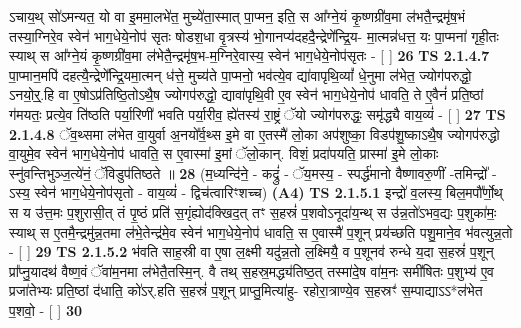 \documentclass[17pt]{extarticle}
\begin{document}
                  ऽचाय॒थ् सो॑ऽमन्यत॒ यो वा इ॒ममा॒लभे॑त॒ मुच्ये॑ता॒स्मात् पा॒प्मन॒ इति॒ स आ᳚ग्ने॒यं कृ॒ष्णग्री॑व॒मा ल॑भतै॒न्द्रमृ॑ष॒भं तस्या॒ग्निरे॒व स्वेन॑ भाग॒धेये॒नोप॑ सृतः षोडश॒धा वृ॒त्रस्य॑ भो॒गानप्य॑दहदै॒न्द्रेणे᳚न्द्रि॒य- मा॒त्मन्न॑धत्त॒ यः पा॒प्मना॑ गृही॒तः स्याथ् स आ᳚ग्ने॒यं कृ॒ष्णग्री॑व॒मा ल॑भेतै॒न्द्रमृ॑ष॒भ-म॒ग्निरे॒वास्य॒ स्वेन॑ भाग॒धेये॒नोप॑सृतः - [  ] \textbf{  26} \newline
                  \newline
                                \textbf{ TS 2.1.4.7} \newline
                  पा॒प्मान॒मपि॑ दहत्यै॒न्द्रेणे᳚न्द्रि॒यमा॒त्मन् ध॑त्ते॒ मुच्य॑ते पा॒प्मनो॒ भव॑त्ये॒व द्या॑वापृथि॒व्यां᳚ धे॒नुमा ल॑भेत॒ ज्योग॑परुद्धो॒ ऽनयो॒र्॒॒.हि वा  ए॒षोऽप्र॑तिष्ठि॒तोऽथै॒ष ज्योगप॑रुद्धो॒ द्यावा॑पृथि॒वी ए॒व स्वेन॑ भाग॒धेये॒नोप॑ धावति॒ ते ए॒वैनं॑ प्रति॒ष्ठां ग॑मयतः॒ प्रत्ये॒व ति॑ष्ठति पर्या॒रिणी॑ भवति पर्या॒रीव॒ ह्ये॑तस्य॑ रा॒ष्ट्रं ॅयो ज्योग॑परुद्धः॒ समृ॑द्ध्यै वाय॒व्यं॑ - [  ] \textbf{  27} \newline
                  \newline
                                \textbf{ TS 2.1.4.8} \newline
                  ॅव॒थ्समा ल॑भेत वा॒युर्वा अ॒नयो᳚र्व॒थ्स इ॒मे वा ए॒तस्मै॑ लो॒का अप॑शुष्का॒ विडप॑शु॒ष्काऽथै॒ष ज्योगप॑रुद्धो वा॒युमे॒व स्वेन॑ भाग॒धेये॒नोप॑ धावति॒ स ए॒वास्मा॑ इ॒मां ॅलो॒कान्. विशं॒ प्रदा॑पयति॒ प्रास्मा॑ इ॒मे लो॒काः स्नु॑वन्तिभुञ्ज॒त्ये॑नं॒ ॅविडुप॑तिष्ठते ॥ \textbf{  28} \newline
                  \newline
                      (म॒ध्यन्दि॑ने॒ - कद्रुं॑ - ॅय॒मस्य॒ - स्पर्द्ध॑मानो वैष्णावरु॒णीं -तमिन्द्रो᳚ - ऽस्य॒ स्वेन॑ भाग॒धेये॒नोप॑सृतो - वाय॒व्यं॑ - द्विच॑त्वारिꣳशच्च)  \textbf{(A4)} \newline \newline
                                        \textbf{ TS 2.1.5.1} \newline
                  इन्द्रो॑ व॒लस्य॒ बिल॒मपौ᳚र्णो॒थ् स य उ॑त्त॒मः प॒शुरासी॒त् तं पृ॒ष्ठं प्रति॑ स॒गृंह्योद॑क्खिद॒त् तꣳ स॒हस्रं॑ प॒शवोऽनूदा॑य॒न्थ् स उ॑न्न॒तो॑ऽभव॒द्यः प॒शुका॑मः॒ स्याथ् स ए॒तमै॒न्द्रमु॑न्न॒तमा ल॑भे॒तेन्द्र॑मे॒व स्वेन॑ भाग॒धेये॒नोप॑ धावति॒ स ए॒वास्मै॑ प॒शून् प्रय॑च्छति पशु॒माने॒व भ॑वत्युन्न॒तो -  [  ] \textbf{  29} \newline
                  \newline
                                \textbf{ TS 2.1.5.2} \newline
                  भ॑वति साह॒स्री वा ए॒षा ल॒क्ष्मी यदु॑न्न॒तो ल॒क्ष्मियै॒ व प॒शूनव॑ रुन्धे य॒दा स॒हस्रं॑ प॒शून् प्रा᳚प्नु॒यादथ॑ वैष्ण॒वं ॅवा॑म॒नमा ल॑भेतै॒तस्मि॒न्. वै तथ् स॒हस्र॒मद्ध्य॑तिष्ठ॒त् तस्मा॑दे॒ष वा॑म॒नः समी॑षितः प॒शुभ्य॑ ए॒व प्रजा॑तेभ्यः प्रति॒ष्ठां द॑धाति॒ को॑ऽर्.हति स॒हस्रं॑ प॒शून् प्राप्तु॒मित्या॑हु- रहोरा॒त्राण्ये॒व स॒हस्रꣳ॑ स॒म्पाद्याऽऽ*ल॑भेत प॒शवो॒ - [  ] \textbf{  30} \newline
\end{document}
